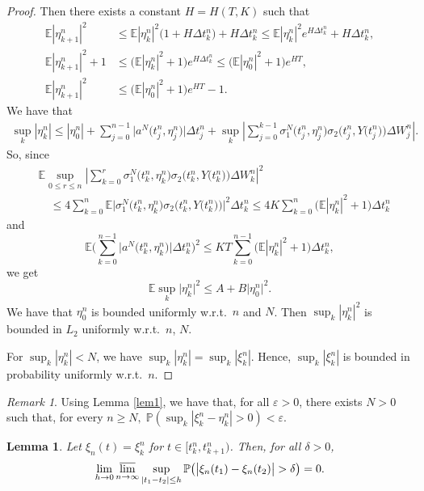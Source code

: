 \documentclass[numbers,compress,v1.0.1]{vmsta}
\newtheorem{lemma}{Lemma}
\theoremstyle{remark}
\newtheorem{remark}{Remark}
\newcommand{\E}{\mathbb E}
\renewcommand{\P}{\mathbb P}
\newcommand*{\abs}[1]{\left\lvert#1\right\rvert}
\begin{document}
\begin{proof}
%
Then there exists a constant $H=H(T,K)$ such that
%
\begin{align*}
\E\abs{\eta_{k+1}^n}^2&\leq\E\abs{
\eta_k^n}^2\bigl(1+H\Delta
t_k^n\bigr)+H\Delta t_k^n \leq
\E\abs{\eta_k^n}^2 e^{H\Delta t_k^n}+H\Delta
t_k^n,
\\
\E\abs{\eta_{k+1}^n}^2+1&\leq \bigl(\E\abs{
\eta_k^n}^2+1 \bigr) e^{H\Delta t_k^n}\leq
\bigl(\E\abs{\eta_0^n}^2+1 \bigr)
e^{HT},
\\
\E\abs{\eta_{k+1}^n}^2&\leq \bigl(\E\abs{
\eta_0^n}^2+1 \bigr) e^{HT}-1.
\end{align*}
%
We have that
%
\begin{align*}
\sup_k\abs{\eta_k^n} \leq\abs{
\eta_0^n } + \sum_{j=0}^{n-1}
\big|a^N \bigl(t_j^n,\eta_j^n
\bigr)\big| \Delta t_j^n
+\sup_k\abs{\sum_{j=0}^{k-1}
\sigma^N_1 \bigl(t_j^n,
\eta_j^n \bigr) \sigma_2
\bigl(t_j^n,Y \bigl(t_j^n \bigr)
\bigr) \Delta W_j^n}.
\end{align*}
%
So, since
%
\begin{align*}
&\E\sup_{0 \leq r \leq n}\abs{\sum_{k=0}^{r}
\sigma^N_1\bigl(t_k^n,
\eta_k^n\bigr) \sigma_2\bigl(t_k^n,Y
\bigl(t_k^n\bigr)\bigr) \Delta W_k^n}^2
\\
&\quad\leq4 \sum_{k=0}^{n} \E\big|
\sigma^N_1\bigl(t_k^n,
\eta_k^n\bigr) \sigma_2\bigl(t_k^n,Y
\bigl(t_k^n\bigr)\bigr)\big|^2 \Delta
t_k^n \leq4 K \sum_{k=0}^{n}
\bigl(\E\abs{\eta_k^n}^2+1\bigr)\Delta
t_k^n
\end{align*}
%
and
%
\[
\E \Biggl( \sum_{k=0}^{n-1}
\big|a^N\bigl(t_k^n,\eta_k^n
\bigr)\big| \Delta t_k^n \Biggr)^2\leq KT\sum
_{k=0}^{n-1}\bigl(\E\abs{\eta_k^n}^2+1
\bigr)\Delta t_k^n,
\]
%
we get
%
\[
\E\sup_k \big|\eta_k^n
\big|^2 \leq A+B\big| \eta_0^n\big|^2.
\]
%
We have that $ \eta_0^n$ is bounded uniformly w.r.t.\ $n$ and $N$. Then
$\sup_k|\eta_k^n|^2$ is bounded in $L_2$ uniformly w.r.t.\ $n$, $N$.

For $\sup_k |\eta_k^n|< N$, we have $\sup_k|\eta_k^n|=\sup_k
|\xi_k^n|$.
Hence, $\sup_k|\xi_k^n|$ is bounded in probability uniformly
w.r.t.\ $n$.
\end{proof}
%
\begin{remark}\label{r1}
Using Lemma \ref{lem1}, we have that, for all $\varepsilon>0$, there
exists $N>0$ such that,
for every $n \ge N, \; \P(\sup_k |\xi_k^n -\eta_k^n|
>0)<\varepsilon$.
\end{remark}
%
\begin{lemma}\label{lem 2}
Let $\xi_n(t)=\xi_k^n$ for $t\in[t_k^n,t_{k+1}^n)$. Then, for all
$\delta>0$,
%
\[
\lim_{h\rightarrow0}\varlimsup_{n\rightarrow\infty}\sup_{\abs
{t_1-t_2}\leq h}
\P\bigl(\big|\xi_n(t_1) -\xi_n(t_2)\big|
>\delta\bigr)=0.
\]
%
\end{lemma}
\end{document}
